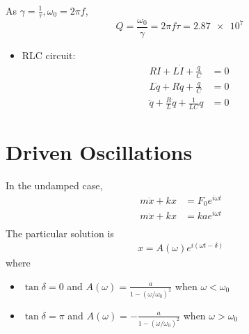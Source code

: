 \documentclass[a4paper]{article}
\numberwithin{equation}{section}
\begin{document}
\begin{sol}
    As $\gamma=\frac{1}{\tau}, \omega_0=2\pi f$, 
    \begin{equation}
        Q=\frac{\omega_0}{\gamma}=2\pi f\tau=\SI{2.87e+7}{}
    \end{equation}
\end{sol}
\begin{itemize}
    \item RLC circuit:
    \begin{align}
        RI+L\dot I+\frac{q}{C}&=0\\
        L\ddot q+R\dot q+\frac{q}{C}&=0\\
        \ddot q+\frac{R}{L}\dot q+\frac{1}{LC}q&=0
    \end{align}
\end{itemize}
\section{Driven Oscillations}
In the undamped case,
\begin{align}
    m\ddot x+kx&=F_0e^{i\omega t}\\
    m\ddot x+kx&=ka e^{i\omega t}\\
\end{align}
The particular solution is 
\begin{align}
    x=A(\omega)e^{i(\omega t-\delta)}
\end{align} 
where
\begin{itemize}
    \item $\tan\delta=0$ and $A(\omega)=\frac{a}{1-(\omega/\omega_0)^2}$ when $\omega<\omega_0$
    \item $\tan\delta=\pi$ and $A(\omega)=-\frac{a}{1-(\omega/\omega_0)^2}$ when $\omega>\omega_0$
\end{itemize}
\end{document}
